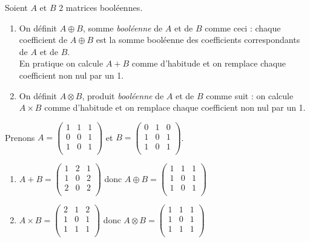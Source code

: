\documentclass[a4paper,12pt]{book}
\begin{document}
\begin{definition}
Soient $A$ et $B$ 2 matrices booléennes.
\begin{enumerate}[--]
	\item 	On définit $A\oplus B$, somme \textit{booléenne} de $A$ et de $B$ comme ceci : chaque coefficient de $A\oplus B$ est la somme booléenne des coefficients correspondants de $A$ et de $B$.\\
	En pratique on calcule $A+B$ comme d'habitude et on remplace chaque coefficient non nul par un 1.
	\item 	On définit $A\otimes B$, produit \textit{booléenne} de $A$ et de $B$ comme suit : on calcule $A\times B$ comme d'habitude et on remplace chaque coefficient non nul par un 1.
\end{enumerate}
\end{definition}
\begin{exemple}[s]

Prenons $A=\begin{pmatrix}
1 & 1 & 1 \\
0 & 0 & 1 \\
1 & 0 & 1 \\
\end{pmatrix}$ et $B=\begin{pmatrix}
0 & 1 & 0 \\
1 & 0 & 1 \\
1 & 0 & 1 \\
\end{pmatrix}$.
\begin{enumerate}[\textbullet]
	\item 	$A+B=\begin{pmatrix}
	1 & 2 & 1 \\
	1 & 0 & 2 \\
	2 & 0 & 2 \\
	\end{pmatrix}$ donc $A\oplus B=\begin{pmatrix}
		1 & 1 & 1 \\
		1 & 0 & 1 \\
		1 & 0 & 1 \\
		\end{pmatrix}$
	\item 	$A\times B =\begin{pmatrix}
		2 & 1 & 2 \\
		1 & 0 & 1 \\
		1 & 1 & 1 \\
		\end{pmatrix}$ donc $A\otimes B=\begin{pmatrix}
			1 & 1 & 1 \\
			1 & 0 & 1 \\
			1 & 1 & 1 \\
			\end{pmatrix}$
\end{enumerate}
\end{exemple}
\end{document}
